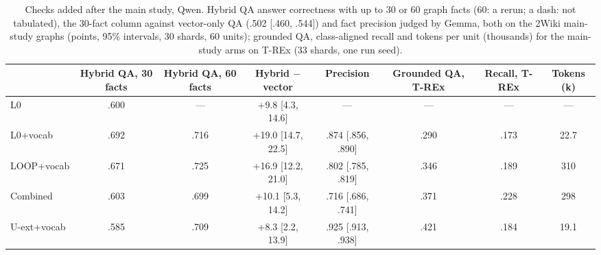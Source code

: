 \begin{table}[!ht]
\centering
\caption{Checks added after the main study, Qwen. Hybrid QA answer correctness with up to 30 or 60 graph facts (60: a rerun; a dash: not tabulated), the 30-fact column against vector-only QA (.502 [.460, .544]) and fact precision judged by Gemma, both on the 2Wiki main-study graphs (points, 95\% intervals, 30 shards, 60 units); grounded QA, class-aligned recall and tokens per unit (thousands) for the main-study arms on T-REx (33 shards, one run seed).}
\label{tab:newchecks}
\scriptsize\setlength{\tabcolsep}{2.5pt}
\begin{tabular}{lccccccc}
\toprule
 & Hybrid QA, 30 facts & Hybrid QA, 60 facts & Hybrid $-$ vector & Precision & Grounded QA, T-REx & Recall, T-REx & Tokens (k) \\
\midrule
L0 & .600 & --- & +9.8 [4.3, 14.6] & --- & --- & --- & --- \\
L0+vocab & .692 & .716 & +19.0 [14.7, 22.5] & .874 [.856, .890] & .290 & .173 & 22.7 \\
LOOP+vocab & .671 & .725 & +16.9 [12.2, 21.0] & .802 [.785, .819] & .346 & .189 & 310 \\
Combined & .603 & .699 & +10.1 [5.3, 14.2] & .716 [.686, .741] & .371 & .228 & 298 \\
U-ext+vocab & .585 & .709 & +8.3 [2.2, 13.9] & .925 [.913, .938] & .421 & .184 & 19.1 \\
\bottomrule
\end{tabular}
\end{table}

